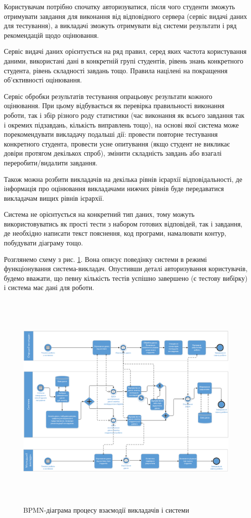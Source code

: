 Користувачам потрібно спочатку авторизуватися, після чого студенти зможуть
отримувати завдання для виконання від відповідного сервера (сервіс видачі даних
для тестування), а викладачі зможуть отримувати від системи результати і ряд
рекомендацій щодо оцінювання.

Сервіс видачі даних орієнтується на ряд правил, серед яких частота користування
даними, використані дані в конкретній групі студентів, рівень знань конкретного
студента, рівень складності завдань тощо.
Правила націлені на покращення об’єктивності оцінювання.

Сервіс обробки результатів тестування опрацьовує результати кожного оцінювання.
При цьому відбувається як перевірка правильності виконання роботи, так і збір
різного роду статистики (час виконання як всього завдання так і окремих
підзавдань, кількість виправлень тощо), на основі якої система може
порекомендувати викладачу подальші дії: провести повторне тестування
конкретного студента, провести усне опитування (якщо студент не викликає довіри
протягом декількох спроб), змінити складність завдань або взагалі
переробити/видалити завдання.

Також можна розбити викладачів на декілька рівнів ієрархії відповідальності, де
інформація про оцінювання викладачами нижчих рівнів буде передаватися викладачам
вищих рівнів ієрархії.

Система не орієнтується на конкретний тип даних, тому можуть використовуватись
як прості тести з набором готових відповідей, так і завдання, де необхідно
написати текст пояснення, код програми, намалювати контур, побудувати діаграму
тощо.

Розглянемо схему з рис. \ref{fig:bpmn_teachers}.
Вона описує поведінку системи в режимі функціонування система-викладач.
Опустивши деталі авторизування користувачів, будемо вважати, що певну кількість
тестів успішно завершено (є тестову вибірку) і система має дані для роботи.

\begin{figure}[b!]
    \center\includegraphics[height=30em,angle=-90]{images/bpmn_teachers.png}
    \caption{BPMN-діаграма процесу взаємодії викладачів і системи}
    \label{fig:bpmn_teachers}
\end{figure}

